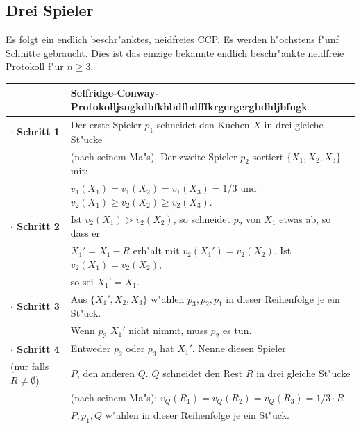 \documentclass[11pt, a4paper, twoside]{article}
\newcommand{\wf}{\color{white}}
\newcommand{\tf}{\color{black}}
\numberwithin{equation}{section}
\begin{document}
\subsection{Drei Spieler}
Es folgt ein endlich beschr"anktes, neidfreies CCP. Es werden h"ochstens f"unf Schnitte gebraucht. Dies ist das einzige bekannte endlich beschr"ankte neidfreie Protokoll f"ur $n \geq 3$.\\
\newline
\begin{tabular}{|ll|}
\hline
&\textbf{Selfridge-Conway-Protokoll}\wf jsngkdbfkhbdfbdfffkrgergergbdhljbfngk\tf\\
\hline
\textbf{$\cdot$ Schritt 1}&Der erste Spieler $p_1$ schneidet den Kuchen $X$ in drei gleiche St"ucke\\&(nach seinem Ma"s). Der zweite Spieler $p_2$ sortiert $\{X_1,X_2,X_3\}$ mit:\\
& $v_1(X_1)=v_1(X_2)=v_1(X_3)=1/3$ und $v_2(X_1) \geq v_2(X_2) \geq v_2(X_3)$.\\
\textbf{$\cdot$ Schritt 2}& Ist $v_2(X_1)>v_2(X_2)$, so schneidet $p_2$ von $X_1$ etwas ab, so dass er\\&$X_1'=X_1-R$ erh"alt mit   $v_2(X_1')=v_2(X_2)$. Ist $v_2(X_1)=v_2(X_2)$,\\&so sei $X_1'=X_1$.\\
\textbf{$\cdot$ Schritt 3}&Aus $\{X_1',X_2,X_3\}$ w"ahlen $p_3,p_2,p_1$ in dieser Reihenfolge je ein St"uck.\\&Wenn $p_3$ $X_1'$ nicht nimmt, muss $p_2$ es tun.\\
\textbf{$\cdot$ Schritt 4}& Entweder $p_2$ oder $p_3$ hat $X_1'$. Nenne diesen Spieler\\(nur falls $R \neq \emptyset$)&$P$, den anderen $Q$. $Q$ schneidet den Rest $R$ in drei gleiche St"ucke\\&(nach seinem Ma"s): $v_Q(R_1)=v_Q(R_2)=v_Q(R_3)=1/3 \cdot R$\\& $P,p_1,Q$ w"ahlen in dieser Reihenfolge je ein St"uck.\\
\hline
\end{tabular}
\newline
\newline
\newline
\end{document}
